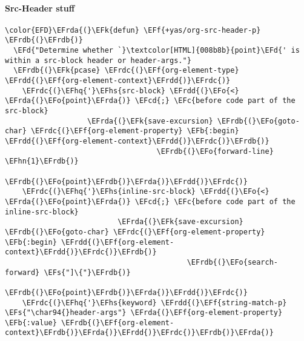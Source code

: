 \documentclass{article}
\newcommand{\EFc}[1]{\textcolor{EFc}{#1}} %
\newcommand{\EFcd}[1]{\textcolor{EFcd}{#1}} %
\newcommand{\EFs}[1]{\textcolor{EFs}{#1}} %
\newcommand{\EFd}[1]{\textcolor{EFd}{#1}} %
\newcommand{\EFk}[1]{\textcolor{EFk}{#1}} %
\newcommand{\EFb}[1]{\textcolor{EFb}{#1}} %
\newcommand{\EFf}[1]{\textcolor{EFf}{#1}} %
\newcommand{\EFo}[1]{\textcolor{EFo}{#1}} %
\newcommand{\EFhn}[1]{\textcolor{EFhn}{\textbf{#1}}} %
\newcommand{\EFhq}[1]{#1} %
\newcommand{\EFhs}[1]{\textcolor{EFhs}{#1}} %
\newcommand{\EFrda}[1]{\textcolor{EFrda}{#1}} %
\newcommand{\EFrdb}[1]{\textcolor{EFrdb}{#1}} %
\newcommand{\EFrdc}[1]{\textcolor{EFrdc}{#1}} %
\newcommand{\EFrdd}[1]{\textcolor{EFrdd}{#1}} %
\begin{document}
\paragraph{Src-Header stuff}
\label{sec:orgfbae6d2}
\begin{Code}
\begin{Verbatim}
\color{EFD}\EFrda{(}\EFk{defun} \EFf{+yas/org-src-header-p} \EFrdb{(}\EFrdb{)}
  \EFd{"Determine whether `}\textcolor[HTML]{008b8b}{point}\EFd{' is within a src-block header or header-args."}
  \EFrdb{(}\EFk{pcase} \EFrdc{(}\EFf{org-element-type} \EFrdd{(}\EFf{org-element-context}\EFrdd{)}\EFrdc{)}
    \EFrdc{(}\EFhq{'}\EFhs{src-block} \EFrdd{(}\EFo{<} \EFrda{(}\EFo{point}\EFrda{)} \EFcd{;} \EFc{before code part of the src-block}
                   \EFrda{(}\EFk{save-excursion} \EFrdb{(}\EFo{goto-char} \EFrdc{(}\EFf{org-element-property} \EFb{:begin} \EFrdd{(}\EFf{org-element-context}\EFrdd{)}\EFrdc{)}\EFrdb{)}
                                   \EFrdb{(}\EFo{forward-line} \EFhn{1}\EFrdb{)}
                                   \EFrdb{(}\EFo{point}\EFrdb{)}\EFrda{)}\EFrdd{)}\EFrdc{)}
    \EFrdc{(}\EFhq{'}\EFhs{inline-src-block} \EFrdd{(}\EFo{<} \EFrda{(}\EFo{point}\EFrda{)} \EFcd{;} \EFc{before code part of the inline-src-block}
                          \EFrda{(}\EFk{save-excursion} \EFrdb{(}\EFo{goto-char} \EFrdc{(}\EFf{org-element-property} \EFb{:begin} \EFrdd{(}\EFf{org-element-context}\EFrdd{)}\EFrdc{)}\EFrdb{)}
                                          \EFrdb{(}\EFo{search-forward} \EFs{"]\{"}\EFrdb{)}
                                          \EFrdb{(}\EFo{point}\EFrdb{)}\EFrda{)}\EFrdd{)}\EFrdc{)}
    \EFrdc{(}\EFhq{'}\EFhs{keyword} \EFrdd{(}\EFf{string-match-p} \EFs{"\char94{}header-args"} \EFrda{(}\EFf{org-element-property} \EFb{:value} \EFrdb{(}\EFf{org-element-context}\EFrdb{)}\EFrda{)}\EFrdd{)}\EFrdc{)}\EFrdb{)}\EFrda{)}

\end{Verbatim}
\end{Code}
\end{document}
